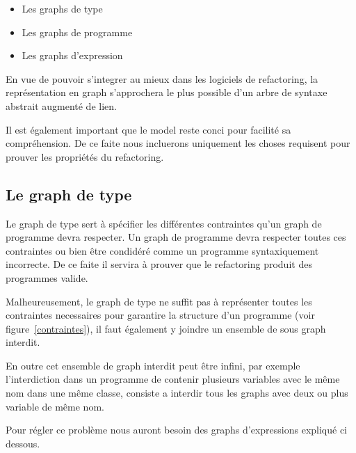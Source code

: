 \documentclass[a4paper, 12pt]{article}
\begin{document}
\begin{itemize}[label=\textbullet]
\item Les graphs de type
\item Les graphs de programme
\item Les graphs d'expression
\end{itemize}

En vue de pouvoir s'integrer au mieux dans les logiciels de refactoring, la représentation en graph s'approchera le plus possible d'un arbre de syntaxe abstrait augmenté de lien.

Il est également important que le model reste conci pour facilité sa compréhension. De ce faite nous incluerons uniquement les choses requisent pour prouver les propriétés du refactoring.

\subsection{Le graph de type}

Le graph de type sert à spécifier les différentes contraintes qu'un graph de programme devra respecter. Un graph de programme devra respecter toutes ces contraintes ou bien être condidéré comme un programme syntaxiquement incorrecte. De ce faite il servira à prouver que le refactoring produit des programmes valide.

Malheureusement, le graph de type ne suffit pas à représenter toutes les contraintes necessaires pour garantire la structure d'un programme (voir figure~\ref{contraintes}), il faut également y joindre un ensemble de sous graph interdit.

En outre cet ensemble de graph interdit peut être infini, par exemple l'interdiction dans un programme de contenir plusieurs variables avec le même nom dans une même classe, consiste a interdir tous les graphs avec deux ou plus variable de même nom.

Pour régler ce problème nous auront besoin des graphs d'expressions expliqué ci dessous.\label{subsec:graphExpression}
\end{document}
